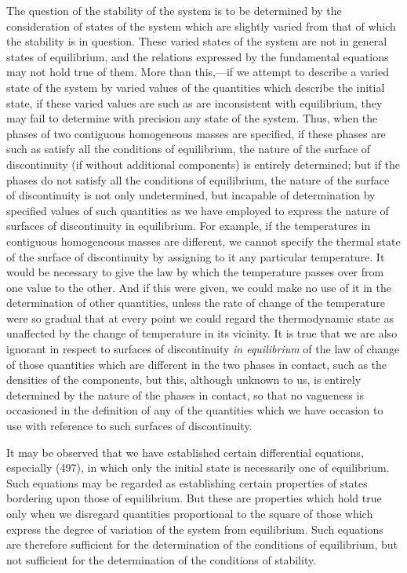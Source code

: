 \documentclass[12pt]{article}
\begin{document}
{The question of the stability of the system is to be determined by the consideration of states of the system which are slightly varied from that of which the stability is in question. These varied states of the system are not in general states of equilibrium, and the relations expressed by the fundamental equations may not hold true of them. More than this,---if we attempt to describe a varied state of the system by varied values of the quantities which describe the initial state, if these varied values are such as are inconsistent with equilibrium, they may fail to determine with precision any state of the system. Thus, when the phases of two contiguous homogeneous masses are specified, if these phases are such as satisfy all the conditions of equilibrium, the nature of the surface of discontinuity (if without additional components) is entirely determined; but if the phases do not satisfy all the conditions of equilibrium, the nature of the surface of discontinuity is not only undetermined, but incapable of determination by specified values of such quantities as we have employed to express the nature of surfaces of discontinuity in equilibrium. For example, if the temperatures in contiguous homogeneous masses are different, we cannot specify the thermal state of the surface of discontinuity by assigning to it any particular temperature. It would be necessary to give the law by which the temperature passes over from one value to the other. And if this were given, we could make no use of it in the determination of other quantities, unless the rate of change of the temperature were so gradual that at every point we could regard the thermodynamic state as unaffected by the change of temperature in its vicinity. It is true that we are also ignorant in respect to surfaces of discontinuity \textit{in equilibrium} of the law of change of those quantities which are different in the two phases in contact, such as the densities of the components, but this, although unknown to us, is entirely determined by the nature of the phases in contact, so that no vagueness is occasioned in the definition of any of the quantities which we have occasion to use with reference to such surfaces of discontinuity.

It may be observed that we have established certain differential equations, especially (497), in which only the initial state is necessarily one of equilibrium. Such equations may be regarded as establishing certain properties of states bordering upon those of equilibrium. But these are properties which hold true only when we disregard quantities proportional to the square of those which express the degree of variation of the system from equilibrium. Such equations are therefore sufficient for the determination of the conditions of equilibrium, but not sufficient for the determination of the conditions of stability.

}
\end{document}
